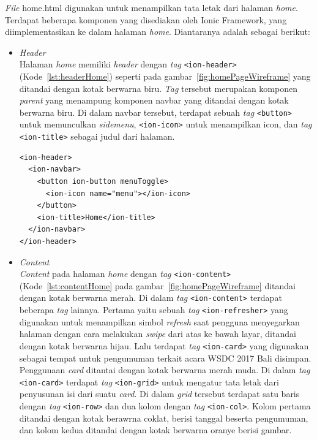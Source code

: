 \begin{enumerate}
\textit{File} home.html digunakan untuk menampilkan tata letak dari halaman \textit{home}. Terdapat beberapa komponen yang disediakan oleh Ionic Framework, yang diimplementasikan ke dalam halaman \textit{home}. Diantaranya adalah sebagai berikut:	

	\begin{itemize}
		\item \textit{Header} \\
		Halaman \textit{home} memiliki \textit{header} dengan \textit{tag} \texttt{<ion-header>} (Kode~\ref{lst:headerHome}) seperti pada gambar~\ref{fig:homePageWireframe} yang ditandai dengan kotak berwarna biru. \textit{Tag} tersebut merupakan komponen \textit{parent} yang menampung komponen navbar yang ditandai dengan kotak berwarna biru. Di dalam navbar tersebut, terdapat sebuah \textit{tag} \texttt{<button>} untuk memunculkan \textit{sidemenu}, \texttt{<ion-icon>} untuk menampilkan icon, dan \textit{tag} \texttt{<ion-title>} sebagai judul dari halaman.
		
\begin{lstlisting}[label={lst:headerHome}, caption=\textit{Header} pada home.html]
<ion-header>
  <ion-navbar>
    <button ion-button menuToggle>
      <ion-icon name="menu"></ion-icon>
    </button>
    <ion-title>Home</ion-title>
  </ion-navbar>
</ion-header>
\end{lstlisting}

		\item \textit{Content} \\
		\textit{Content} pada halaman \textit{home} dengan \textit{tag} \texttt{<ion-content>} (Kode~\ref{lst:contentHome} pada gambar~\ref{fig:homePageWireframe} ditandai dengan kotak berwarna merah. Di dalam \textit{tag} \texttt{<ion-content>} terdapat beberapa \textit{tag} lainnya. Pertama yaitu sebuah \textit{tag} \texttt{<ion-refresher>} yang digunakan untuk menampilkan simbol \textit{refresh} saat pengguna menyegarkan halaman dengan cara melakukan \textit{swipe} dari atas ke bawah layar, ditandai dengan kotak berwarna hijau. Lalu terdapat \textit{tag} \texttt{<ion-card>} yang digunakan sebagai tempat untuk pengumuman terkait acara WSDC 2017 Bali disimpan. Penggunaan \textit{card} ditantai dengan kotak berwarna merah muda. Di dalam \textit{tag} \texttt{<ion-card>} terdapat \textit{tag} \texttt{<ion-grid>} untuk mengatur tata letak dari penyusunan isi dari suatu \textit{card}. Di dalam \textit{grid} tersebut terdapat satu baris dengan \textit{tag} \texttt{<ion-row>} dan dua kolom dengan \textit{tag} \texttt{<ion-col>}. Kolom pertama ditandai dengan kotak berawrna coklat, berisi tanggal beserta pengumuman, dan kolom kedua ditandai dengan kotak berwarna oranye berisi gambar.
		

\end{itemize}
\end{enumerate}
